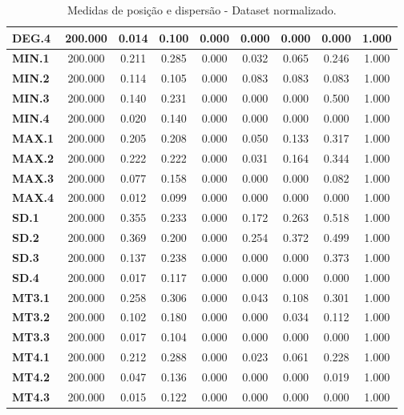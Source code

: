 \documentclass[
	article,			%
	11pt,				%
	oneside,			%
	a4paper,			%
	english,			%
	brazil,				%
	sumario=tradicional
	]{abntex2}
\begin{document}
\begin{table}[h!]
\begin{tabular}{l|c|c|c|c|c|c|c|c|}
\multicolumn{1}{|l|}{\textbf{DEG.4}}  & 200.000 & 0.014 & 0.100 & 0.000 & 0.000 & 0.000 & 0.000 & 1.000 \\ \hline
\multicolumn{1}{|l|}{\textbf{MIN.1}}  & 200.000 & 0.211 & 0.285 & 0.000 & 0.032 & 0.065 & 0.246 & 1.000 \\ \hline
\multicolumn{1}{|l|}{\textbf{MIN.2}}  & 200.000 & 0.114 & 0.105 & 0.000 & 0.083 & 0.083 & 0.083 & 1.000 \\ \hline
\multicolumn{1}{|l|}{\textbf{MIN.3}}  & 200.000 & 0.140 & 0.231 & 0.000 & 0.000 & 0.000 & 0.500 & 1.000 \\ \hline
\multicolumn{1}{|l|}{\textbf{MIN.4}}  & 200.000 & 0.020 & 0.140 & 0.000 & 0.000 & 0.000 & 0.000 & 1.000 \\ \hline
\multicolumn{1}{|l|}{\textbf{MAX.1}}  & 200.000 & 0.205 & 0.208 & 0.000 & 0.050 & 0.133 & 0.317 & 1.000 \\ \hline
\multicolumn{1}{|l|}{\textbf{MAX.2}}  & 200.000 & 0.222 & 0.222 & 0.000 & 0.031 & 0.164 & 0.344 & 1.000 \\ \hline
\multicolumn{1}{|l|}{\textbf{MAX.3}}  & 200.000 & 0.077 & 0.158 & 0.000 & 0.000 & 0.000 & 0.082 & 1.000 \\ \hline
\multicolumn{1}{|l|}{\textbf{MAX.4}}  & 200.000 & 0.012 & 0.099 & 0.000 & 0.000 & 0.000 & 0.000 & 1.000 \\ \hline
\multicolumn{1}{|l|}{\textbf{SD.1}}   & 200.000 & 0.355 & 0.233 & 0.000 & 0.172 & 0.263 & 0.518 & 1.000 \\ \hline
\multicolumn{1}{|l|}{\textbf{SD.2}}   & 200.000 & 0.369 & 0.200 & 0.000 & 0.254 & 0.372 & 0.499 & 1.000 \\ \hline
\multicolumn{1}{|l|}{\textbf{SD.3}}   & 200.000 & 0.137 & 0.238 & 0.000 & 0.000 & 0.000 & 0.373 & 1.000 \\ \hline
\multicolumn{1}{|l|}{\textbf{SD.4}}   & 200.000 & 0.017 & 0.117 & 0.000 & 0.000 & 0.000 & 0.000 & 1.000 \\ \hline
\multicolumn{1}{|l|}{\textbf{MT3.1}}  & 200.000 & 0.258 & 0.306 & 0.000 & 0.043 & 0.108 & 0.301 & 1.000 \\ \hline
\multicolumn{1}{|l|}{\textbf{MT3.2}}  & 200.000 & 0.102 & 0.180 & 0.000 & 0.000 & 0.034 & 0.112 & 1.000 \\ \hline
\multicolumn{1}{|l|}{\textbf{MT3.3}}  & 200.000 & 0.017 & 0.104 & 0.000 & 0.000 & 0.000 & 0.000 & 1.000 \\ \hline
\multicolumn{1}{|l|}{\textbf{MT4.1}}  & 200.000 & 0.212 & 0.288 & 0.000 & 0.023 & 0.061 & 0.228 & 1.000 \\ \hline
\multicolumn{1}{|l|}{\textbf{MT4.2}}  & 200.000 & 0.047 & 0.136 & 0.000 & 0.000 & 0.000 & 0.019 & 1.000 \\ \hline
\multicolumn{1}{|l|}{\textbf{MT4.3}}  & 200.000 & 0.015 & 0.122 & 0.000 & 0.000 & 0.000 & 0.000 & 1.000 \\ \hline
\end{tabular}
\caption{Medidas de posição e dispersão - Dataset normalizado.}
\label{tab:est_norm}
\end{table}
\end{document}
